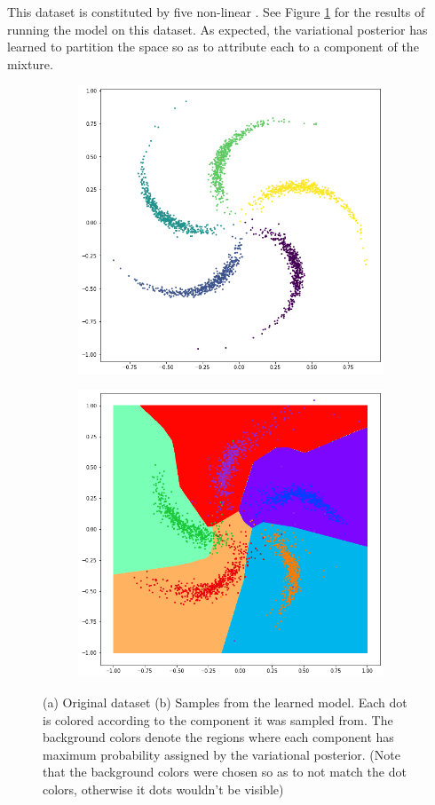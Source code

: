 This dataset is constituted by five non-linear . See Figure \ref{fig:pinwheel}
for the results of running the model on this dataset. As expected, the variational
posterior has learned to partition the space so as to attribute each  to
a component of the mixture. 
\begin{figure}
\centering
  \begin{subfigure}[t]{.5\textwidth}
    \raggedleft
    \includegraphics[width=0.6\linewidth]{figures/original_pinwheel.png}
  \end{subfigure}%
  \begin{subfigure}[t]{.5\textwidth}
    \raggedright
    \includegraphics[width=0.6\linewidth]{figures/trained_pinwheel.png}
  \end{subfigure}
  \caption{\scriptsize (a) Original dataset (b) Samples from the learned model. Each
dot is colored according to the component it was sampled from. The background
colors denote the regions where each component has maximum probability assigned
by the variational posterior. (Note that the background colors were chosen
so as to not match the dot colors, otherwise it dots wouldn't be visible)}
  \label{fig:pinwheel}
\end{figure}

